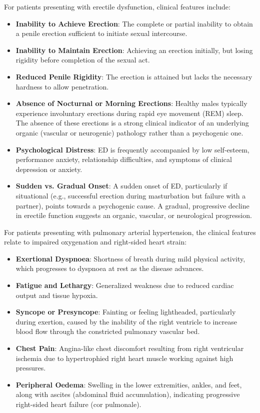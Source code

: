 For patients presenting with erectile dysfunction, clinical features include:
\begin{itemize}
    \item \textbf{Inability to Achieve Erection}: The complete or partial inability to obtain a penile erection sufficient to initiate sexual intercourse.
    \item \textbf{Inability to Maintain Erection}: Achieving an erection initially, but losing rigidity before completion of the sexual act.
    \item \textbf{Reduced Penile Rigidity}: The erection is attained but lacks the necessary hardness to allow penetration.
    \item \textbf{Absence of Nocturnal or Morning Erections}: Healthy males typically experience involuntary erections during rapid eye movement (REM) sleep. The absence of these erections is a strong clinical indicator of an underlying organic (vascular or neurogenic) pathology rather than a psychogenic one.
    \item \textbf{Psychological Distress}: ED is frequently accompanied by low self-esteem, performance anxiety, relationship difficulties, and symptoms of clinical depression or anxiety.
    \item \textbf{Sudden vs. Gradual Onset}: A sudden onset of ED, particularly if situational (e.g., successful erection during masturbation but failure with a partner), points towards a psychogenic cause. A gradual, progressive decline in erectile function suggests an organic, vascular, or neurological progression.
\end{itemize}

For patients presenting with pulmonary arterial hypertension, the clinical features relate to impaired oxygenation and right-sided heart strain:
\begin{itemize}
    \item \textbf{Exertional Dyspnoea}: Shortness of breath during mild physical activity, which progresses to dyspnoea at rest as the disease advances.
    \item \textbf{Fatigue and Lethargy}: Generalized weakness due to reduced cardiac output and tissue hypoxia.
    \item \textbf{Syncope or Presyncope}: Fainting or feeling lightheaded, particularly during exertion, caused by the inability of the right ventricle to increase blood flow through the constricted pulmonary vascular bed.
    \item \textbf{Chest Pain}: Angina-like chest discomfort resulting from right ventricular ischemia due to hypertrophied right heart muscle working against high pressures.
    \item \textbf{Peripheral Oedema}: Swelling in the lower extremities, ankles, and feet, along with ascites (abdominal fluid accumulation), indicating progressive right-sided heart failure (cor pulmonale).
\end{itemize}


